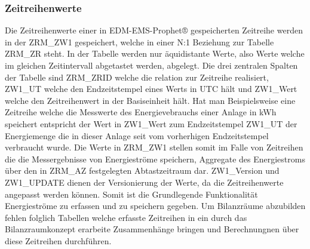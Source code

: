 \subsubsection{Zeitreihenwerte}

Die Zeitreihenwerte einer in EDM-EMS-Prophet® gespeicherten Zeitreihe werden in der ZRM\_ZW1 gespeichert, welche in einer N:1 Beziehung zur Tabelle ZRM\_ZR steht.
In der Tabelle werden nur äquidistante Werte, also Werte welche im gleichen Zeitintervall abgetastet werden, abgelegt.
Die drei zentralen Spalten der Tabelle sind ZRM\_ZRID welche die relation zur Zeitreihe realisiert, ZW1\_UT welche den Endzeitstempel eines Werts in UTC hält 
und ZW1\_Wert welche den Zeitreihenwert in der Basiseinheit hält.
Hat man Beispielsweise eine Zeitreihe welche die Messwerte des Energievebrauchs einer Anlage in kWh speichert entspricht der Wert in ZW1\_Wert zum Endzeitstempel 
ZW1\_UT der Energiemenge die in dieser Anlage seit vom vorherhigen Endzeitstempel verbraucht wurde. 
Die Werte in ZRM\_ZW1 stellen somit im Falle von Zeitreihen die die Messergebnisse von Energieströme speichern, Aggregate des Energiestroms über den in ZRM\_AZ 
festgelegten Abtastzeitraum dar.
ZW1\_Version und ZW1\_UPDATE dienen der Versionierung der Werte, da die Zeitreihenwerte angepasst werden können.
Somit ist die Grundlegende Funktionalität Energieströme zu erfassen und zu speichern gegeben. 
Um Bilanzräume abzubilden fehlen folglich Tabellen welche erfasste Zeitreihen in ein durch das Bilanzraumkonzept erarbeite Zusammenhänge bringen und Berechnungnen 
über diese Zeitreihen durchführen.